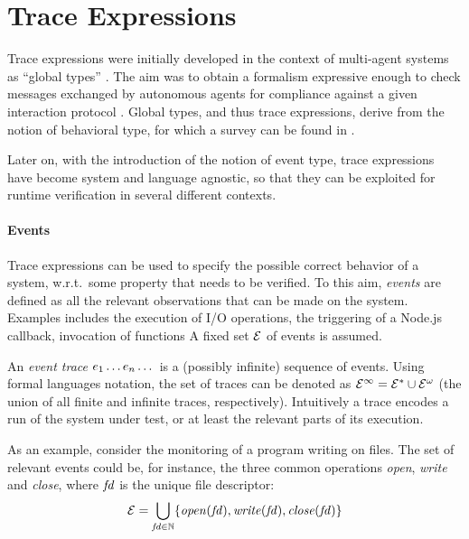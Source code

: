 \section{Trace Expressions}
\label{sec:trace}
Trace expressions were initially developed in the context of multi-agent systems as ``global types'' \cite{AnconaDM12}.
The aim was to obtain a formalism expressive enough to check messages exchanged by autonomous agents for compliance against a given interaction protocol \cite{AnconaBFMT14, BriolaMA14}.
Global types, and thus trace expressions, derive from the notion of behavioral type, for which a survey can be found in \cite{AnconaBB0CDGGGH16}.

Later on, with the introduction of the notion of event type, trace expressions have become system and language agnostic, so that they can be exploited for runtime verification in several different contexts.

\paragraph{Events}
Trace expressions can be used to specify the possible correct behavior of a system, w.r.t.\ some property that needs to be verified.
To this aim, \emph{events} are defined as all the relevant observations that can be made on the system.
Examples includes the execution of I/O operations, the triggering of a Node.js callback, invocation of functions\textellipsis{} A fixed set \(\mathcal{E}\) of events is assumed.

An \emph{event trace} \(e_1\dots e_n\dots\) is a (possibly infinite) sequence of events.
Using formal languages notation, the set of traces can be denoted as \(\mathcal{E}^\infty = \mathcal{E}^* \cup \mathcal{E}^\omega\) (the union of all finite and infinite traces, respectively).
Intuitively a trace encodes a run of the system under test, or at least the relevant parts of its execution.

As an example, consider the monitoring of a program writing on files.
The set of relevant events could be, for instance, the three common operations \emph{open}, \emph{write} and \emph{close}, where \(\mathit{fd}\) is the unique file descriptor:
\begin{equation}\label{eq:filedomain}
\mathcal{E} = \bigcup_{\mathit{fd} \in \mathbb{N}} \{\mathit{open}(\mathit{fd}), \mathit{write}(\mathit{fd}), \mathit{close}(\mathit{fd})\}
\end{equation}

